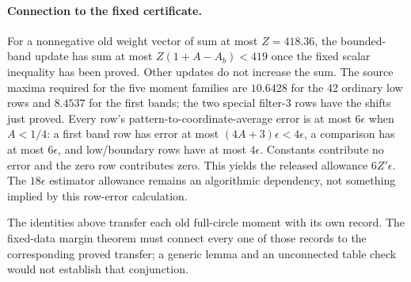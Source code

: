 \paragraph{Connection to the fixed certificate.}
For a nonnegative old weight vector of sum at most $Z=418.36$, the
bounded-band update has sum at most $Z(1+A-A_b)<419$ once the fixed
scalar inequality has been proved. Other updates do not increase the
sum. The source maxima required for the five moment families are
$10.6428$ for the 42 ordinary low rows and $8.4537$ for the first bands;
the two special filter-3 rows have the shifts just proved. Every row's
pattern-to-coordinate-average error is at most $6\epsilon$ when
$A<1/4$: a first band row has error at most $(4A+3)\epsilon<4\epsilon$,
a comparison has at most $6\epsilon$, and low/boundary rows have at
most $4\epsilon$. Constants contribute no error and the zero row
contributes zero. This yields the released allowance $6Z'\epsilon$.
The $18\epsilon$ estimator allowance remains an algorithmic dependency,
not something implied by this row-error calculation.

The identities above transfer each old full-circle moment with its own
record. The fixed-data margin theorem must connect every one of those
records to the corresponding proved transfer; a generic lemma and an
unconnected table check would not establish that conjunction.
